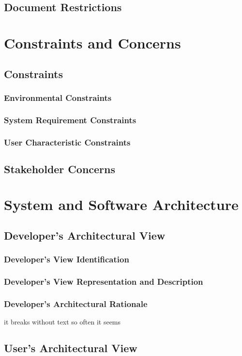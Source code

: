 \documentclass[12pt,a4paper]{article}
\begin{document}
	\subsection{Document Restrictions}
\section{Constraints and Concerns}
	\subsection{Constraints}
		\subsubsection{Environmental Constraints}
		\subsubsection{System Requirement Constraints}
		\subsubsection{User Characteristic Constraints}
	\subsection{Stakeholder Concerns}
\section{System and Software Architecture}
	\subsection{Developer's Architectural View}
		\subsubsection{Developer's View Identification}
		\subsubsection{Developer's View Representation and Description}
		\subsubsection{Developer's Architectural Rationale} it breaks without text so often it seems
	\subsection{User's Architectural View}
\end{document}

